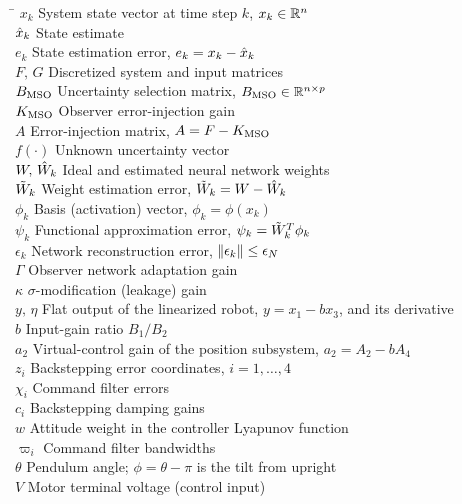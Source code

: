 \begin{tabbing}
\hspace{1.3in}\=\kill
$x_k$        \> System state vector at time step $k$, $x_k\in\mathbb{R}^n$ \\
$\hat{x}_k$    \> State estimate \\
$e_k$        \> State estimation error, $e_k=x_k-\hat{x}_k$ \\
$F,\,G$      \> Discretized system and input matrices \\
$B_{\mathrm{MSO}}$        \> Uncertainty selection matrix, $B_{\mathrm{MSO}}\in\mathbb{R}^{n\times p}$ \\
$K_{\mathrm{MSO}}$        \> Observer error-injection gain \\
$A$          \> Error-injection matrix, $A=F-K_{\mathrm{MSO}}$ \\
$f(\cdot)$   \> Unknown uncertainty vector \\
$W,\,\hat{W}_k$\> Ideal and estimated neural network weights \\
$\tilde{W}_k$      \> Weight estimation error, $\tilde{W}_k=W-\hat{W}_k$ \\
$\phi_k$     \> Basis (activation) vector, $\phi_k=\phi(x_k)$ \\
$\psi_k$     \> Functional approximation error, $\psi_k=\tilde{W}_k^T\phi_k$ \\
$\epsilon_k$ \> Network reconstruction error, $\left\lVert \epsilon_k \right\rVert\le\epsilon_N$ \\
$\Gamma$     \> Observer network adaptation gain \\
$\kappa$     \> $\sigma$-modification (leakage) gain \\
$y,\,\eta$   \> Flat output of the linearized robot, $y=x_1-bx_3$, and its derivative \\
$b$          \> Input-gain ratio $B_1/B_2$ \\
$a_2$        \> Virtual-control gain of the position subsystem, $a_2=A_2-bA_4$ \\
$z_i$        \> Backstepping error coordinates, $i=1,\dots,4$ \\
$\chi_i$     \> Command filter errors \\
$c_i$        \> Backstepping damping gains \\
$w$          \> Attitude weight in the controller Lyapunov function \\
$\varpi_i$   \> Command filter bandwidths \\
$\theta$     \> Pendulum angle; $\phi=\theta-\pi$ is the tilt from upright \\
$V$          \> Motor terminal voltage (control input) \\
\end{tabbing}
\doublespacing
\clearpage
